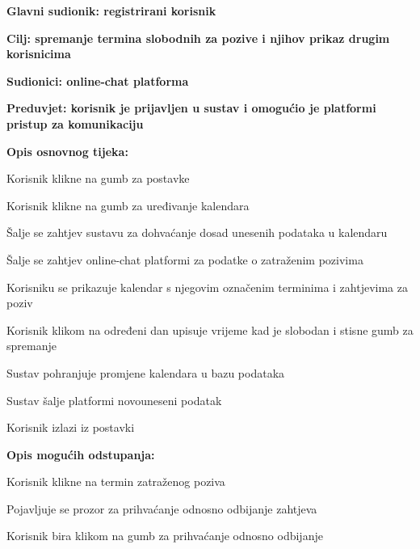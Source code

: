 					\noindent {}
					\begin{packed_item}
						\item \textbf{Glavni sudionik: registrirani korisnik}
						\item  \textbf{Cilj: spremanje termina slobodnih za pozive i njihov prikaz drugim korisnicima}
						\item  \textbf{Sudionici: online-chat platforma}
						\item  \textbf{Preduvjet: korisnik je prijavljen u sustav i omogućio je platformi pristup za komunikaciju}
						
						\item  \textbf{Opis osnovnog tijeka:}
						\item[] \begin{packed_enum}
							\item Korisnik klikne na gumb za postavke
							\item Korisnik klikne na gumb za uređivanje kalendara
							\item Šalje se zahtjev sustavu za dohvaćanje dosad unesenih podataka u kalendaru
							\item Šalje se zahtjev online-chat platformi za podatke o zatraženim pozivima
							\item Korisniku se prikazuje kalendar s njegovim označenim terminima i zahtjevima za poziv
							\item Korisnik klikom na određeni dan upisuje vrijeme kad je slobodan i stisne gumb za spremanje
							\item Sustav pohranjuje promjene kalendara u bazu podataka
							\item Sustav šalje platformi novouneseni podatak
							\item Korisnik izlazi iz postavki
						\end{packed_enum}
						
						\item  \textbf{Opis mogućih odstupanja:}
							\begin{packed_item}
								\item[6.a] Korisnik klikne na termin zatraženog poziva
								\begin{packed_enum}
									\item Pojavljuje se prozor za prihvaćanje odnosno odbijanje zahtjeva
									\item Korisnik bira klikom na gumb za prihvaćanje odnosno odbijanje
								\end{packed_enum}
							\end{packed_item}
					\end{packed_item}
				
